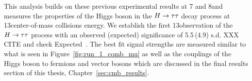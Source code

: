 This analysis builds on these previous experimental results at 7 and 8\TeV and measures the
properties of the Higgs boson in the $H\to\tau\tau$ decay process at 13\TeV center-of-mass 
collisions energy. We establish the first 13\TeV observation of the $H\to\tau\tau$
process with an observed (expected) significance of 5.5\,(4.9) s.d. XXX CITE and 
check Expected~\cite{MYPAPER}. The best fit signal strengths are measured similar
to what is seen in Figure~\ref{fig:run_1_comb_mu} as well as the couplings of the
Higgs boson to fermions and vector bosons which are discussed in the final results
section of this thesis, Chapter~\ref{sec:cmb_results}.


%

